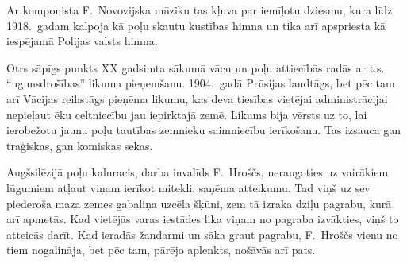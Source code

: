 \documentclass[twoside,a5paper,12pt,fleqn,openany]{extbook}
\begin{document}
Ar komponista F.~Novovijska mūziku tas kļuva par iemīļotu dziesmu, kura līdz 1918.~gadam kalpoja kā poļu skautu kustības himna un tika arī apspriesta kā iespējamā Polijas valsts himna.

Otrs sāpīgs punkts XX gadsimta sākumā vācu un poļu attiecībās radās ar t.s. ``ugunsdrošības'' likuma pieņemšanu. 1904.~gadā Prūsijas landtāgs, bet pēc tam arī Vācijas reihstāgs pieņēma likumu, kas deva tiesības vietējai administrācijai nepieļaut ēku celtniecību jau iepirktajā zemē. Likums bija vērsts uz to, lai ierobežotu jaunu poļu tautības zemnieku saimniecību ierīkošanu. Tas izsauca gan traģiskas, gan komiskas sekas.

Augšsilēzijā poļu kalnracis, darba invalīds F.~Hroščs, neraugoties uz vairākiem lūgumiem atļaut viņam ierīkot mitekli, saņēma atteikumu. Tad viņš uz sev piederoša maza zemes gabaliņa uzcēla šķūni, zem tā izraka dziļu pagrabu, kurā arī apmetās. Kad vietējās varas iestādes lika viņam no pagraba izvākties, viņš to atteicās darīt. Kad ieradās žandarmi un sāka graut pagrabu, F.~Hroščs vienu no tiem nogalināja, bet pēc tam, pārējo aplenkts, nošāvās arī pats.
\end{document}
